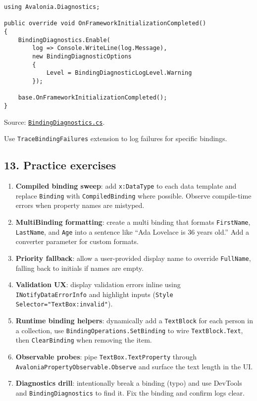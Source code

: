 \begin{lstlisting}
using Avalonia.Diagnostics;

public override void OnFrameworkInitializationCompleted()
{
    BindingDiagnostics.Enable(
        log => Console.WriteLine(log.Message),
        new BindingDiagnosticOptions
        {
            Level = BindingDiagnosticLogLevel.Warning
        });

    base.OnFrameworkInitializationCompleted();
}
\end{lstlisting}

Source:
\href{https://github.com/AvaloniaUI/Avalonia/blob/master/src/Avalonia.Diagnostics/Diagnostics/BindingDiagnostics.cs}{\passthrough{\lstinline!BindingDiagnostics.cs!}}.

Use \passthrough{\lstinline!TraceBindingFailures!} extension to log
failures for specific bindings.

\subsection{13. Practice exercises}\label{practice-exercises-2}

\begin{enumerate}
\def\labelenumi{\arabic{enumi}.}
\tightlist
\item
  \textbf{Compiled binding sweep}: add
  \passthrough{\lstinline!x:DataType!} to each data template and replace
  \passthrough{\lstinline!Binding!} with
  \passthrough{\lstinline!CompiledBinding!} where possible. Observe
  compile-time errors when property names are mistyped.
\item
  \textbf{MultiBinding formatting}: create a multi binding that formats
  \passthrough{\lstinline!FirstName!},
  \passthrough{\lstinline!LastName!}, and \passthrough{\lstinline!Age!}
  into a sentence like ``Ada Lovelace is 36 years old.'' Add a converter
  parameter for custom formats.
\item
  \textbf{Priority fallback}: allow a user-provided display name to
  override \passthrough{\lstinline!FullName!}, falling back to initials
  if names are empty.
\item
  \textbf{Validation UX}: display validation errors inline using
  \passthrough{\lstinline!INotifyDataErrorInfo!} and highlight inputs
  (\passthrough{\lstinline!Style Selector="TextBox:invalid"!}).
\item
  \textbf{Runtime binding helpers}: dynamically add a
  \passthrough{\lstinline!TextBlock!} for each person in a collection,
  use \passthrough{\lstinline!BindingOperations.SetBinding!} to wire
  \passthrough{\lstinline!TextBlock.Text!}, then
  \passthrough{\lstinline!ClearBinding!} when removing the item.
\item
  \textbf{Observable probes}: pipe
  \passthrough{\lstinline!TextBox.TextProperty!} through
  \passthrough{\lstinline!AvaloniaPropertyObservable.Observe!} and
  surface the text length in the UI.
\item
  \textbf{Diagnostics drill}: intentionally break a binding (typo) and
  use DevTools and \passthrough{\lstinline!BindingDiagnostics!} to find
  it. Fix the binding and confirm logs clear.
\end{enumerate}

